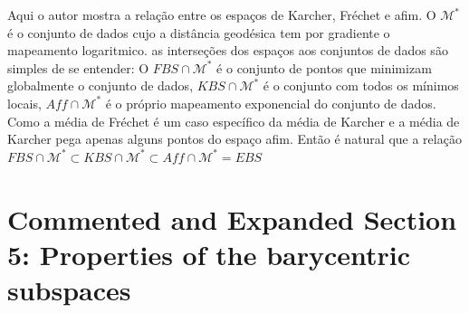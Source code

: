 \documentclass[a4paper,titlepage]{article}
\begin{document}
Aqui o autor mostra a relação entre os espaços de Karcher, Fréchet  e afim. O $\mathcal{M}^*$ é o conjunto de dados cujo a distância geodésica tem por gradiente o mapeamento logaritmico. as interseções dos espaços aos conjuntos de dados são simples de se entender: O $FBS \cap \mathcal{M}^*$ é o conjunto de pontos que minimizam globalmente o conjunto de dados, $KBS \cap \mathcal{M}^*$
é o conjunto com todos os mínimos locais, $Aff \cap \mathcal{M}^*$ é o próprio mapeamento exponencial do conjunto de dados. Como a média de Fréchet é um caso específico da média de Karcher e a média de Karcher pega apenas alguns pontos do espaço afim. Então é natural que a relação $FBS \cap \mathcal{M}^* \subset KBS \cap \mathcal{M}^* \subset Aff \cap \mathcal{M}^* = EBS$

\section{Commented and Expanded Section 5: Properties of the barycentric
subspaces}
\end{document}
